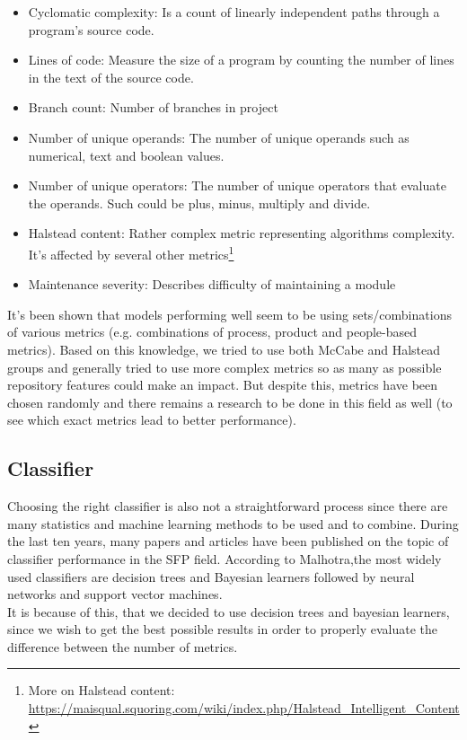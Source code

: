 \begin{itemize}
\item Cyclomatic complexity: Is a count of linearly independent paths through a program's source code. 
\item Lines of code: Measure the size of a program by counting the number of lines in the text of the source code.
\item Branch count: Number of branches in project 
\item Number of unique operands: The number of unique operands such as numerical, text and boolean values.
\item Number of unique operators: The number of unique operators that evaluate the operands. Such could be plus, minus, multiply and divide. 
\item Halstead content: Rather complex metric representing algorithms complexity. It's affected by several other metrics\footnote{More on Halstead content: \url{https://maisqual.squoring.com/wiki/index.php/Halstead_Intelligent_Content}}

\item Maintenance severity: Describes difficulty of maintaining a module
\end{itemize}

It's been shown that models performing well seem to be using sets/combinations of various metrics (e.g. combinations of process, product and people-based metrics)\cite{hall2012systematic}. Based on this knowledge, we tried to use both McCabe and Halstead groups and generally tried to use more complex metrics so as many as possible repository features could make an impact. But despite this, metrics have been chosen randomly and there remains a research to be done in this field as well (to see which exact metrics lead to better performance).

\subsection{Classifier}
Choosing the right classifier is also not a straightforward process since there are many statistics and machine learning methods to be used and to combine. During the last ten years, many papers and articles have been published on the topic of classifier performance in the SFP field. According to Malhotra\cite{malhotra2015systematic},the most widely used classifiers are decision trees and Bayesian learners followed by neural networks and support vector machines\cite[p.~11]{malhotra2015systematic}.\\
It is because of this, that we decided to use decision trees and bayesian learners, since we wish to get the best possible results in order to properly evaluate the difference between the number of metrics.
